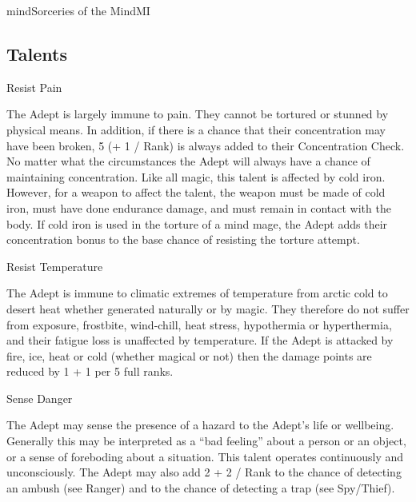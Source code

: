 \begin{college}[1.6]{mind}{Sorceries of the Mind}{MI}
\subsection{Talents}

\begin{talent}[T-1]{Resist Pain}

\begin{effects}
The Adept is largely immune to pain. They cannot be tortured or
stunned by physical means. In addition, if there is a chance that
their concentration may have been broken, 5 (+ 1 / Rank) is always
added to their Concentration Check. No matter what the circumstances
the Adept will always have a chance of maintaining concentration. Like
all magic, this talent is affected by cold iron. However, for a weapon
to affect the talent, the weapon must be made of cold iron, must have
done endurance damage, and must remain in contact with the body. If
cold iron is used in the torture of a mind mage, the Adept adds their
concentration bonus to the base chance of resisting the torture
attempt.
\end{effects}
\end{talent}

\begin{talent}[T-2]{Resist Temperature}

\begin{effects}
The Adept is immune to climatic extremes of temperature from arctic
cold to desert heat whether generated naturally or by magic. They
therefore do not suffer from exposure, frostbite, wind-chill, heat
stress, hypothermia or hyperthermia, and their fatigue loss is
unaffected by temperature. If the Adept is attacked by fire, ice, heat
or cold (whether magical or not) then the damage points are reduced by
1 + 1 per 5 full ranks.
\end{effects}
\end{talent}

\begin{talent}[T-3]{Sense Danger}

\begin{effects}
The Adept may sense the presence of a hazard to the Adept's life or
wellbeing. Generally this may be interpreted as a ``bad feeling''
about a person or an object, or a sense of foreboding about a
situation.  This talent operates continuously and unconsciously. The
Adept may also add 2 + 2 / Rank to the chance of detecting an ambush
(see Ranger) and to the chance of detecting a trap (see Spy/Thief).
\end{effects}
\end{talent}


\end{college}
